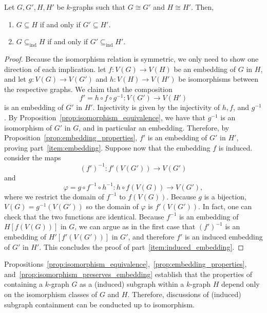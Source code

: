 \begin{proposition} \label{prop:isomorphism_preserves_embedding}
    Let $G, G', H, H'$ be $k$-graphs such that $G \cong G'$ and $H \cong H'$.
    Then,
    \begin{enumerate}
        \item $G \subseteq H$ if and only if $G' \subseteq H'$. \label{item:embedding}
        \item $G \subseteq_{\text{ind}} H$ if and only if $G' \subseteq_{\text{ind}} H'$. \label{item:induced_embedding}
    \end{enumerate}
    \begin{proof} %
        Because the isomorphism relation is symmetric, we only need to show one direction of each implication.
        let $f: V(G) \to V(H)$ be an embedding of $G$ in $H$, and let
        $g: V(G) \to V(G')$ and $h: V(H) \to V(H')$ be isomorphisms between the respective graphs.
        We claim that the composition
        \[
            f' = h \circ f \circ g^{-1}: V(G') \to V(H')
        \]
        is an embedding of $G'$ in $H'$.
        Injectivity is given by the injectivity of $h, f$, and $g^{-1}$.
        By Proposition~\ref{prop:isomorphism_equivalence}, we have that $g^{-1}$ is an isomorphism of $G'$ in $G$,
        and in particular an embedding.
        Therefore, by Proposition~\ref{prop:embedding_properties},
        $f'$ is an embedding of $G'$ in $H'$, proving part~\eqref{item:embedding}.
        Suppose now that the embedding $f$ is induced.
        consider the maps
        \[
            (f')^{-1}: f'(V(G')) \to V(G')
        \]
        and
        \[
            \varphi = g \circ f^{-1} \circ h^{-1}: h \circ f(V(G)) \to V(G'),
        \]
        where we restrict the domain of $f^{-1}$ to $f(V(G))$.
        Because $g$ is a bijection, $V(G) = g^{-1}(V(G'))$ so the
        domain of $\varphi$ is $f'(V(G'))$.
        In fact, one can check that the two functions are identical.
        Because $f^{-1}$ is an embedding of $H[f(V(G))]$ in $G$,
        we can argue as in the first case that
        $(f')^{-1}$ is an embedding of $H'[f'(V(G'))]$ in $G'$,
        and therefore $f'$ is an induced embedding of $G'$ in $H'$.
        This concludes the proof of part~\eqref{item:induced_embedding}.
    \end{proof}
\end{proposition}

Propositions~\ref{prop:isomorphism_equivalence},~\ref{prop:embedding_properties},
and~\ref{prop:isomorphism_preserves_embedding}
establish that the properties of containing a $k$-graph $G$ as a (induced)
subgraph within a $k$-graph $H$ depend only on the isomorphism classes of $G$ and $H$.
Therefore, discussions of (induced) subgraph containment can be conducted up to isomorphism.

